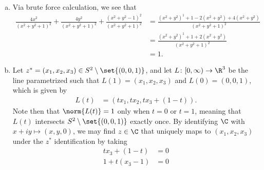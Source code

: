 \documentclass[10pt]{mypackage}
\begin{document}
\begin{solution}\hfill
  \begin{enumerate}[(a)]
    \item Via brute force calculation, we see that
      \begin{align*}
        \frac{4x^2}{\left( x^2 + y^2 + 1 \right)^2} + \frac{4y^2}{\left( x^2 + y^2 + 1 \right)^2} + \frac{\left( x^2 + y^2 - 1 \right)^2}{\left( x^2 + y^2 + 1 \right)^2} &= \frac{\left( x^2 + y^2 \right)^1 + 1 - 2\left( x^2 + y^2 \right) + 4\left( x^2 + y^2 \right)}{\left( x^2 + y^2 + 1 \right)^2}\\
                                                                                                                                                                                                  &= \frac{\left( x^2 + y^2 \right)^1 + 1 + 2\left( x^2 + y^2 \right)}{\left( x^2 + y^2 + 1 \right)^2}\\
                                                                                                                                                                                                                                                                                                                                                                                                                                                                                                                                                                                   &= 1.
      \end{align*}
    \item Let $z^{\ast} = \left( x_1,x_2,x_3 \right)\in S^{2}\setminus \set{(0,0,1)}$, and let $L\colon [0,\infty)\rightarrow \R^3$ be the line parametrized such that $L(1) = \left( x_1,x_2,x_3 \right)$ and $L(0) = \left( 0,0,1 \right)$, which is given by
      \begin{align*}
        L(t) &= \left( tx_1,tx_2, tx_3 + \left( 1-t \right) \right).
      \end{align*}
      Note then that $\norm{L(t)} = 1$ only when $t = 0$ or $t = 1$, meaning that $L(t)$ intersects $S^{2}\setminus \set{(0,0,1)}$ exactly once. By identifying $\C$ with $x + iy \mapsto \left( x,y,0 \right)$, we may find $z\in \C$ that uniquely maps to $\left( x_1,x_2,x_3 \right)$ under the $z^{\ast}$ identification by taking
      \begin{align*}
        tx_3 + \left( 1-t \right) &= 0\\
        1 + t\left( x_3 - 1 \right) &= 0\\

\end{align*}
\end{enumerate}
\end{solution}
\end{document}
